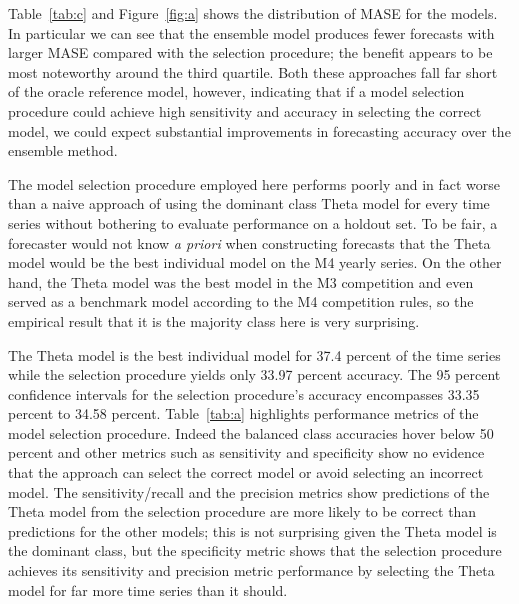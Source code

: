 \documentclass[11pt,3p,review,authoryear]{elsarticle}
\begin{document}
Table~\ref{tab:c} and Figure~\ref{fig:a} shows the distribution of MASE for the models. In particular we can see that the ensemble model produces fewer forecasts with larger MASE compared with the selection procedure; the benefit appears to be most noteworthy around the third quartile. Both these approaches fall far short of the oracle reference model, however, indicating that if a model selection procedure could achieve high sensitivity and accuracy in selecting the correct model, we could expect substantial improvements in forecasting accuracy over the ensemble method. 


The model selection procedure employed here performs poorly and in fact worse than a naive approach of using the dominant class Theta model for every time series without bothering to evaluate performance on a holdout set. To be fair, a forecaster would not know \textit{a priori} when constructing forecasts that the Theta model would be the best individual model on the M4 yearly series. On the other hand, the Theta model was the best model in the M3 competition and even served as a benchmark model according to the M4 competition rules, so the empirical result that it is the majority class here is very surprising.

The Theta model is the best individual model for 37.4 percent of the time series while the selection procedure yields only 33.97 percent accuracy. The 95 percent confidence intervals for the selection procedure's accuracy encompasses 33.35 percent to 34.58 percent. Table~\ref{tab:a} highlights performance metrics of the model selection procedure. Indeed the balanced class accuracies hover below 50 percent and other metrics such as sensitivity and specificity show no evidence that the approach can select the correct model or avoid selecting an incorrect model. The sensitivity/recall and the precision metrics show predictions of the Theta model from the selection procedure are more likely to be correct than predictions for the other models; this is not surprising given the Theta model is the dominant class, but the specificity metric shows that the selection procedure achieves its sensitivity and precision metric performance by selecting the Theta model for far more time series than it should.
\end{document}
